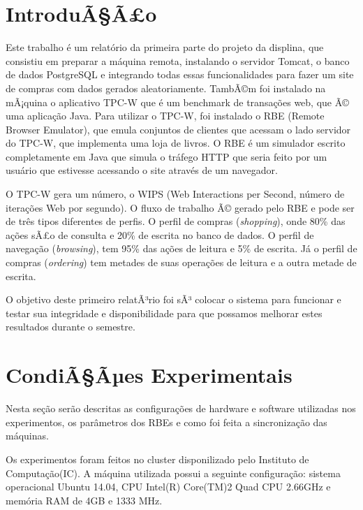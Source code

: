 \documentclass[11pt,twoside]{article}
\begin{document}
\section{IntroduÃ§Ã£o}
\setlength{\parindent}{4ex}
Este trabalho \'e um relat\'orio da primeira parte do projeto da displina, que consistiu em preparar a m\'aquina remota, instalando o servidor Tomcat, o banco de dados PostgreSQL e integrando todas essas funcionalidades para fazer um site de compras com dados gerados aleatoriamente. TambÃ©m foi instalado na mÃ¡quina o aplicativo TPC-W que \'e um benchmark de transa\c{c}\~oes web, que Ã© uma aplica\c{c}\~ao Java. Para utilizar o TPC-W, foi instalado o RBE (Remote Browser Emulator), que emula conjuntos de clientes que acessam o lado servidor do TPC-W, que implementa uma loja de livros. O RBE \'e um simulador escrito completamente em Java que simula o tr\'afego HTTP que seria feito por um usu\'ario que estivesse acessando o site atrav\'es de um navegador.

  O TPC-W gera um n\'umero, o WIPS (Web Interactions per Second, n\'umero de itera\c{c}\~oes Web por segundo). O fluxo de trabalho Ã© gerado pelo RBE e pode ser de tr\^es tipos diferentes de perfis. O perfil de compras (\textit{shopping}), onde 80\% das a\c{c}\~oes sÃ£o de consulta e 20\% de escrita no banco de dados. O perfil de navega\c{c}\~ao (\textit{browsing}), tem 95\% das a\c{c}\~oes de leitura e 5\% de escrita. J\'a o perfil de compras (\textit{ordering}) tem metades de suas opera\c{c}\~oes de leitura e a outra metade de escrita.

  	O objetivo deste primeiro relatÃ³rio foi sÃ³ colocar o sistema para funcionar e testar sua integridade e disponibilidade para que possamos melhorar estes resultados durante o semestre.

\section{CondiÃ§Ãµes Experimentais}
\setlength{\parindent}{4ex}

	 Nesta se\c{c}\~ao ser\~ao descritas as configura\c{c}\~oes de hardware e software utilizadas nos experimentos, os par\^ametros dos RBEs e como foi feita a sincroniza\c{c}\~ao das m\'aquinas.
	
	Os experimentos foram feitos no cluster disponilizado pelo Instituto de Computa\c{c}\~ao(IC). A m\'aquina utilizada possui a seguinte configura\c{c}\~ao: sistema operacional Ubuntu 14.04, CPU Intel(R) Core(TM)2 Quad CPU 2.66GHz e mem\'oria RAM de 4GB e 1333 MHz.
\end{document}
